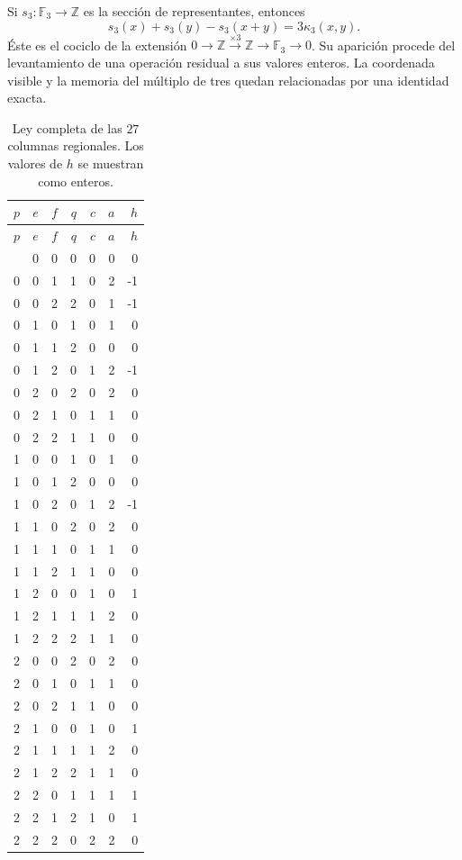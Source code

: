 Si \(s_3:\mathbb F_3\to\mathbb Z\) es la sección de
representantes, entonces
\[
s_3(x)+s_3(y)-s_3(x+y)=3\kappa_3(x,y).
\]
Éste es el cociclo de la extensión
\(0\to\mathbb Z\xrightarrow{\times3}\mathbb Z\to\mathbb F_3\to0\).
Su aparición procede del levantamiento de una operación residual
a sus valores enteros. La coordenada visible y la memoria del
múltiplo de tres quedan relacionadas por una identidad exacta.

\begin{longtable}{ccc|rrrr}
\caption{Ley completa de las \(27\) columnas regionales.
Los valores de \(h\) se muestran como enteros.}
\label{carry27:tabla}\\
\toprule
\(p\)&\(e\)&\(f\)&\(q\)&\(c\)&\(a\)&\(h\)\\
\midrule\endfirsthead
\toprule
\(p\)&\(e\)&\(f\)&\(q\)&\(c\)&\(a\)&\(h\)\\
\midrule\endhead
\bottomrule\endfoot
0&0&0&0&0&0&0\\
0&0&1&1&0&2&-1\\
0&0&2&2&0&1&-1\\
0&1&0&1&0&1&0\\
0&1&1&2&0&0&0\\
0&1&2&0&1&2&-1\\
0&2&0&2&0&2&0\\
0&2&1&0&1&1&0\\
0&2&2&1&1&0&0\\
1&0&0&1&0&1&0\\
1&0&1&2&0&0&0\\
1&0&2&0&1&2&-1\\
1&1&0&2&0&2&0\\
1&1&1&0&1&1&0\\
1&1&2&1&1&0&0\\
1&2&0&0&1&0&1\\
1&2&1&1&1&2&0\\
1&2&2&2&1&1&0\\
2&0&0&2&0&2&0\\
2&0&1&0&1&1&0\\
2&0&2&1&1&0&0\\
2&1&0&0&1&0&1\\
2&1&1&1&1&2&0\\
2&1&2&2&1&1&0\\
2&2&0&1&1&1&1\\
2&2&1&2&1&0&1\\
2&2&2&0&2&2&0\\
\end{longtable}

